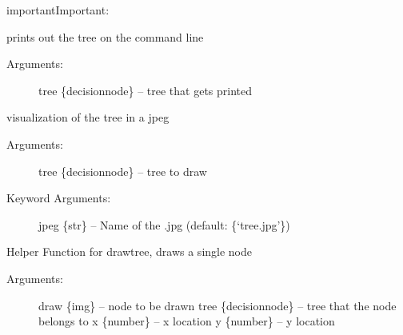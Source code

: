 \documentclass[letterpaper,10pt,english]{sphinxmanual}
\begin{document}
\begin{sphinxadmonition}{important}{Important:}
\label{\detokenize{DT:printtree}}

\begin{fulllineitems}
\label{\detokenize{DT:ForestFire.Main.printtree}}
prints out the tree on the command line
\begin{description}
\item[{Arguments:}] \leavevmode
tree \{decisionnode\} -- tree that gets printed

\end{description}

\end{fulllineitems}

\label{\detokenize{DT:drawtree}}

\begin{fulllineitems}
\label{\detokenize{DT:ForestFire.Main.drawtree}}
visualization of the tree in a jpeg
\begin{description}
\item[{Arguments:}] \leavevmode
tree \{decisionnode\} -- tree to draw

\item[{Keyword Arguments:}] \leavevmode
jpeg \{str\} -- Name of the .jpg (default: \{`tree.jpg'\})

\end{description}

\end{fulllineitems}

\label{\detokenize{DT:drawnode}}

\begin{fulllineitems}
\label{\detokenize{DT:ForestFire.Main.drawnode}}
Helper Function for drawtree, draws a single node
\begin{description}
\item[{Arguments:}] \leavevmode
draw \{img\} -- node to be drawn
tree \{decisionnode\} -- tree that the node belongs to
x \{number\} -- x location
y \{number\} -- y location

\end{description}


\end{fulllineitems}
\end{sphinxadmonition}
\end{document}
